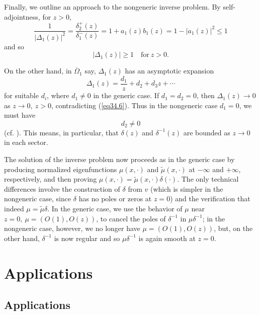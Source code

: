 \documentclass{surv-l}
\theoremstyle{plain}
\theoremstyle{definition}
\numberwithin{equation}{chapter}
\begin{document}
Finally, we outline an approach to the nongeneric inverse problem. By self-adjointness, for $z>0$,
\begin{equation*}
\frac{1}{|\Delta_{1}(z)|^{2}}=\frac{\delta_{2}^{+}(z)}{\delta_{1}^{-}(z)}=1+a_{1}(z)b_{1}(z)=1-|a_{1}(z)|^{2}\leq 1
\end{equation*}
and so
\setcounter{equation}{5}
\begin{equation}\label{eq34.6a}
|\Delta_{1}(z)|\geq 1\quad \mathrm{for}\ z>0.
\end{equation}

On the other hand, in $\overline{\Omega}_{1}$ say, $\Delta_{1}(z)$ has an asymptotic expansion
\begin{equation*}
\Delta_{1}(z)=\frac{d_{1}}{z}+d_{2}+d_{3}z+ \cdots
\end{equation*}
for suitable $d_{i}$, where $d_{1}\neq 0$ in the generic case. If $d_{1}=d_{2}=0$, then $\Delta_{1}(z)\rightarrow 0$ as $z\rightarrow 0,\ z>0$, contradicting (\ref{eq34.6}). Thus in the nongeneric case $d_{1}=0$, we must have
\begin{equation}\label{eq34.7}
d_{2}\neq 0
\end{equation}
(cf. \cite{DT}). This means, in particular, that $\delta(z)$ and $\delta^{-1}(z)$ are bounded as $z\rightarrow 0$ in each sector.

The solution of the inverse problem now proceeds as in the generic case by producing normalized eigenfunctions $\mu(x, \cdot)$ and $\tilde{\mu}(x, \cdot)$ at $-\infty$ and $+\infty$, respectively, and then proving $\mu(x, \cdot)=\tilde{\mu}(x, \cdot)\delta(\cdot)$. The only technical differences involve the construction of $\delta$ from $v$ (which is simpler in the nongeneric case, since $\delta$ has no poles or zeros at $z=0$) and the verification that indeed $\mu=\tilde{\mu}\delta$. In the generic case, we use the behavior of $\mu$ near $z=0,\ \mu=(O(1), O(z))$, to cancel the poles of $\delta^{-1}$ in $\mu\delta^{-1}$; in the nongeneric case, however, we no longer have $\mu=(O(1),O(z))$, but, on the other hand, $\delta^{-1}$ is now regular and so $\mu\delta^{-1}$ is again smooth at $z=0$.

\part{Applications}\label{partIII}

\chapter{Applications}
\end{document}
